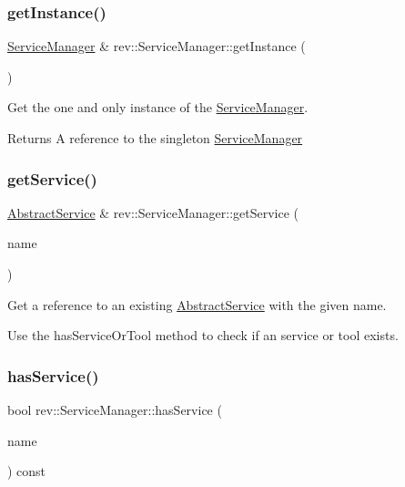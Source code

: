 \subsubsection{\texorpdfstring{getInstance()}{getInstance()}}
{\footnotesize\ttfamily \mbox{\hyperlink{classrev_1_1_service_manager}{Service\+Manager}} \& rev\+::\+Service\+Manager\+::get\+Instance (\begin{DoxyParamCaption}{ }\end{DoxyParamCaption})\hspace{0.3cm}{\ttfamily [static]}}



Get the one and only instance of the \mbox{\hyperlink{classrev_1_1_service_manager}{Service\+Manager}}. 

\begin{DoxyReturn}{Returns}
A reference to the singleton \mbox{\hyperlink{classrev_1_1_service_manager}{Service\+Manager}} 
\end{DoxyReturn}
\mbox{\label{classrev_1_1_service_manager_a88bf7de4e527f12bd2df851b7867b433}} 
\subsubsection{\texorpdfstring{getService()}{getService()}}
{\footnotesize\ttfamily \mbox{\hyperlink{classrev_1_1_abstract_service}{Abstract\+Service}} \& rev\+::\+Service\+Manager\+::get\+Service (\begin{DoxyParamCaption}\item[{const Q\+String \&}]{name }\end{DoxyParamCaption})}



Get a reference to an existing \mbox{\hyperlink{classrev_1_1_abstract_service}{Abstract\+Service}} with the given name. 

Use the has\+Service\+Or\+Tool method to check if an service or tool exists. \mbox{\label{classrev_1_1_service_manager_a0c881de30ce94451c102e41b456ea8c7}} 
\subsubsection{\texorpdfstring{hasService()}{hasService()}}
{\footnotesize\ttfamily bool rev\+::\+Service\+Manager\+::has\+Service (\begin{DoxyParamCaption}\item[{const Q\+String \&}]{name }\end{DoxyParamCaption}) const}



